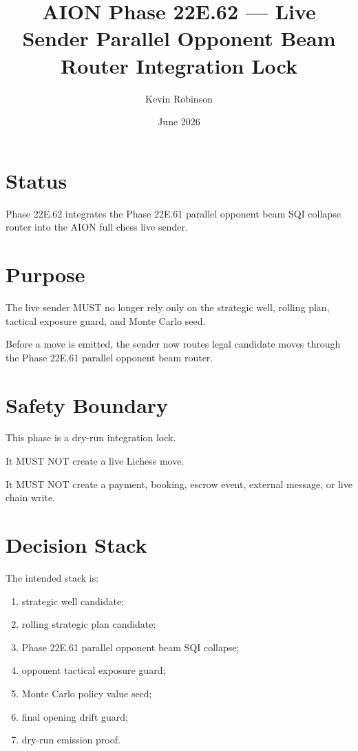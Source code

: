 \documentclass[11pt]{article}
\title{AION Phase 22E.62 --- Live Sender Parallel Opponent Beam Router Integration Lock}
\author{Kevin Robinson}
\date{June 2026}
\begin{document}
\maketitle

\section{Status}

Phase 22E.62 integrates the Phase 22E.61 parallel opponent beam SQI collapse router into the AION full chess live sender.

\section{Purpose}

The live sender MUST no longer rely only on the strategic well, rolling plan, tactical exposure guard, and Monte Carlo seed.

Before a move is emitted, the sender now routes legal candidate moves through the Phase 22E.61 parallel opponent beam router.

\section{Safety Boundary}

This phase is a dry-run integration lock.

It MUST NOT create a live Lichess move.

It MUST NOT create a payment, booking, escrow event, external message, or live chain write.

\section{Decision Stack}

The intended stack is:

\begin{enumerate}[nosep]
  \item strategic well candidate;
  \item rolling strategic plan candidate;
  \item Phase 22E.61 parallel opponent beam SQI collapse;
  \item opponent tactical exposure guard;
  \item Monte Carlo policy value seed;
  \item final opening drift guard;
  \item dry-run emission proof.
\end{enumerate}
\end{document}
